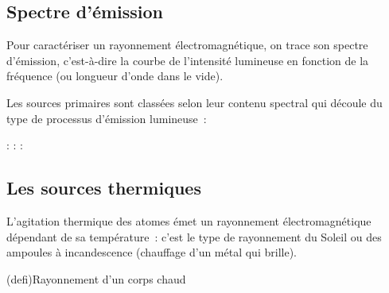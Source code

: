 \documentclass[../../main/main.tex]{subfiles}
\begin{document}
\subsection{Spectre d'émission}

Pour caractériser un rayonnement électromagnétique, on trace son spectre
d'émission, c'est-à-dire la courbe de l'intensité lumineuse en fonction de la
fréquence (ou longueur d'onde dans le vide).

Les sources primaires sont classées selon leur contenu spectral
qui découle du type de processus d'émission lumineuse~:
\begin{itemize}[leftmargin=120pt]
	 : %
	 : %
	 : %
\end{itemize}

\subsection{Les sources thermiques}

L'agitation thermique des atomes émet un rayonnement électromagnétique dépendant
de sa température~: c'est le type de rayonnement du Soleil ou des ampoules à
incandescence (chauffage d'un métal qui brille).

\begin{tcb*}(defi){Rayonnement d'un corps chaud}

\end{tcb*}
\end{document}
